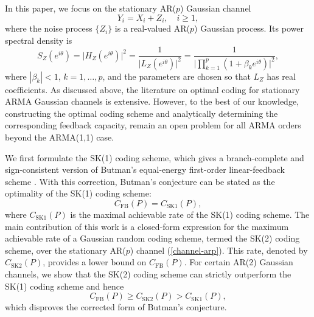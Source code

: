 \documentclass[12pt]{article}
\begin{document}
In this paper, we focus on the stationary AR($p$) Gaussian channel
\begin{equation}\label{channel-arp}
Y_i = X_i + Z_i, \quad i\ge 1,
\end{equation}
where the noise process $\{Z_i\}$ is a real-valued AR($p$) Gaussian process. Its power spectral density \cite{liu2018feedback} is
\begin{equation}\label{sdf-arp}
S_Z(e^{i\theta}) = \vert H_Z(e^{i\theta}) \vert^2 = \frac{1}{\vert L_Z(e^{i\theta}) \vert^2} = \frac{1}{\vert\prod_{k=1}^{p}(1+\beta_ke^{i\theta})\vert^2},
\end{equation}
where $|\beta_k|<1$, $k=1,\ldots,p$, and the parameters are chosen so that \(L_Z\) has real coefficients. As discussed above, the literature on optimal coding for stationary ARMA Gaussian channels is extensive. However, to the best of our knowledge, constructing the optimal coding scheme and  analytically determining the corresponding feedback capacity, remain an open problem for all ARMA orders beyond the ARMA(1,1) case. 

We first formulate the SK(1) coding scheme, which gives a branch-complete and sign-consistent version of Butman's equal-energy first-order linear-feedback scheme \cite{butman1976linear}. With this correction, Butman's conjecture can be stated as the optimality of the SK(1) coding scheme:
$$
    C_{\mathrm{FB}}(P)=C_{\mathrm{SK1}}(P),
$$
where $C_{\mathrm{SK1}}(P)$ is the maximal achievable rate of the SK(1) coding scheme. The main contribution of this work is a closed-form expression for the maximum achievable rate of a Gaussian random coding scheme, termed the SK(2) coding scheme, over the stationary AR($p$) channel (\ref{channel-arp}). This rate, denoted by $C_\mathrm{SK2}(P)$, provides a lower bound on $C_\mathrm{FB}(P)$. For certain AR(2) Gaussian channels, we show that the SK(2) coding scheme can strictly outperform the SK(1) coding scheme and hence
$$
    C_{\mathrm{FB}}(P)\ge C_{\mathrm{SK2}}(P)>C_{\mathrm{SK1}}(P),
$$
which disproves the corrected form of Butman's conjecture.
\end{document}
